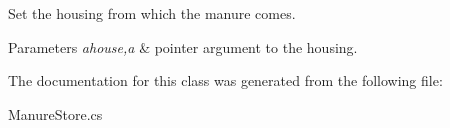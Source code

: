 Set the housing from which the manure comes. 


\begin{DoxyParams}{Parameters}
{\em ahouse,a} & pointer argument to the housing. \\
\hline
\end{DoxyParams}


The documentation for this class was generated from the following file\+:\begin{DoxyCompactItemize}
\item 
Manure\+Store.\+cs\end{DoxyCompactItemize}
